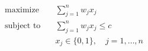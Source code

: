 \begin{align*}
\text{maximize} \quad & \sum_{j=1}^n w_j x_j \\
\text{subject to} \quad & \sum_{j=1}^n w_j x_j \leq c \\
& x_j \in \lbrace 0, 1 \rbrace, \quad j = 1, \ldots,n
\end{align*}



